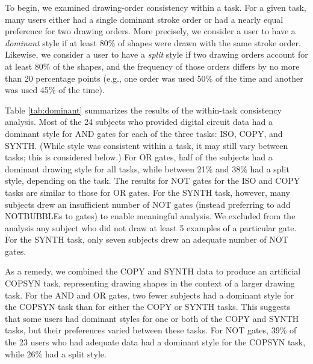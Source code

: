 \documentclass[final,5p,twocolumn]{elsarticle}
\begin{document}
To begin, we examined drawing-order consistency within a task. For a
given task, many users either had a single dominant stroke order or
had a nearly equal preference for two drawing orders. More precisely,
we consider a user to have a {\em dominant} style if at least 80\% of
shapes were drawn with the same stroke order. Likewise, we consider a
user to have a {\em split} style if two drawing orders account for at
least 80\% of the shapes, and the frequency of those orders differs by
no more than 20 percentage points (e.g., one order was used 50\% of
the time and another was used 45\% of the time). 


Table \ref{tab:dominant} summarizes the results of the within-task
consistency analysis.  Most of the 24 subjects who provided digital
circuit data had a dominant style for AND gates for each of the three
tasks: ISO, COPY, and SYNTH.  (While style was consistent within a
task, it may still vary between tasks; this is considered below.) For
OR gates, half of the subjects had a dominant drawing style for all
tasks, while between 21\% and 38\% had a split style, depending on the
task.  The results for NOT gates for the ISO and COPY tasks are
similar to those for OR gates. For the SYNTH task, however, many
subjects drew an insufficient number of NOT gates (instead preferring
to add NOTBUBBLEs to gates) to enable meaningful analysis. We excluded
from the analysis any subject who did not draw at least 5 examples of a
particular gate. For the SYNTH task, only seven subjects drew an
adequate number of NOT gates. 

As a remedy, we combined the COPY and SYNTH data to produce an
artificial COPSYN task, representing drawing shapes in the context of
a larger drawing task. For the AND and OR gates, two fewer subjects
had a dominant style for the COPSYN task than for either the COPY or
SYNTH tasks. This suggests that some users had dominant styles for one
or both of the COPY and SYNTH tasks, but their preferences  varied
between these tasks.  For NOT gates, 39\% of the 23 users who had adequate
data had a dominant style for the COPSYN task, while 26\% had a split
style.
\end{document}
